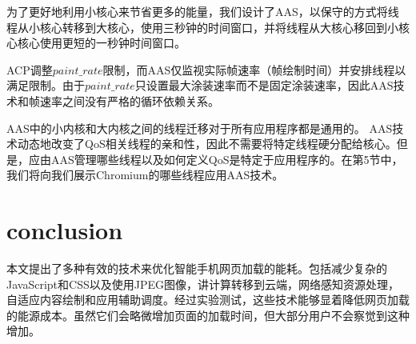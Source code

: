 \documentclass{sig-alternate-05-2015}
\begin{document}
为了更好地利用小核心来节省更多的能量，我们设计了AAS，以保守的方式将线程从小核心转移到大核心，使用三秒钟的时间窗口，并将线程从大核心移回到小核心核心使用更短的一秒钟时间窗口。

ACP调整$paint\_rate$限制，而AAS仅监视实际帧速率（帧绘制时间）并安排线程以满足限制。由于$paint\_rate$只设置最大涂装速率而不是固定涂装速率，因此AAS技术和帧速率之间没有严格的循环依赖关系。

AAS中的小内核和大内核之间的线程迁移对于所有应用程序都是通用的。 AAS技术动态地改变了QoS相关线程的亲和性，因此不需要将特定线程硬分配给核心。但是，应由AAS管理哪些线程以及如何定义QoS是特定于应用程序的。在第5节中，我们将向我们展示Chromium的哪些线程应用AAS技术。

\section{conclusion}

本文提出了多种有效的技术来优化智能手机网页加载的能耗。包括减少复杂的JavaScript和CSS以及使用JPEG图像，讲计算转移到云端，网络感知资源处理，自适应内容绘制和应用辅助调度。经过实验测试，这些技术能够显着降低网页加载的能源成本。虽然它们会略微增加页面的加载时间，但大部分用户不会察觉到这种增加。
\end{document}
